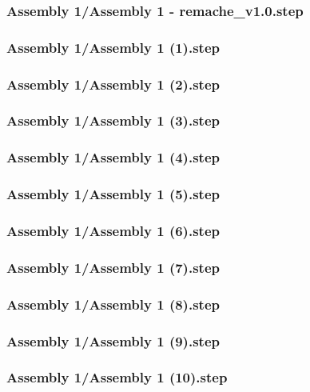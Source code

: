 \documentclass[a4paper,12pt]{article}
\begin{document}
\subsubsection{Assembly 1/Assembly 1 - remache_v1.0.step}

\subsubsection{Assembly 1/Assembly 1 (1).step}

\subsubsection{Assembly 1/Assembly 1 (2).step}

\subsubsection{Assembly 1/Assembly 1 (3).step}

\subsubsection{Assembly 1/Assembly 1 (4).step}

\subsubsection{Assembly 1/Assembly 1 (5).step}

\subsubsection{Assembly 1/Assembly 1 (6).step}

\subsubsection{Assembly 1/Assembly 1 (7).step}

\subsubsection{Assembly 1/Assembly 1 (8).step}

\subsubsection{Assembly 1/Assembly 1 (9).step}

\subsubsection{Assembly 1/Assembly 1 (10).step}

\end{document}
